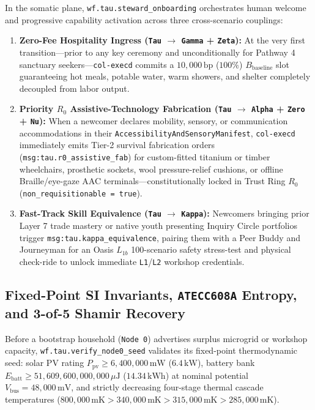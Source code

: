 In the somatic plane, \texttt{wf.tau.steward\_onboarding} orchestrates human welcome and progressive
capability activation across three cross-scenario couplings:
\begin{enumerate}
    \item \textbf{Zero-Fee Hospitality Ingress (\texttt{Tau} $\to$ \texttt{Gamma} + \texttt{Zeta}):}
    At the very first transition---prior to any key ceremony and unconditionally for Pathway 4
    sanctuary seekers---\texttt{col-execd} commits a $10{,}000\,\mathrm{bp}$ ($100\%$)
    $B_{\mathrm{baseline}}$ slot guaranteeing hot meals, potable water, warm showers, and shelter
    completely decoupled from labor output.
    \item \textbf{Priority $R_0$ Assistive-Technology Fabrication (\texttt{Tau} $\to$ \texttt{Alpha}
    + \texttt{Zero} + \texttt{Nu}):} When a newcomer declares mobility, sensory, or communication
    accommodations in their \texttt{AccessibilityAndSensoryManifest}, \texttt{col-execd} immediately
    emits Tier-2 survival fabrication orders (\texttt{msg:tau.r0\_assistive\_fab}) for custom-fitted
    titanium or timber wheelchairs, prosthetic sockets, wool pressure-relief cushions, or offline
    Braille/eye-gaze AAC terminals---constitutionally locked in Trust Ring $R_0$
    (\texttt{non\_requisitionable = true}).
    \item \textbf{Fast-Track Skill Equivalence (\texttt{Tau} $\to$ \texttt{Kappa}):} Newcomers
    bringing prior Layer 7 trade mastery or native youth presenting Inquiry Circle portfolios trigger
    \texttt{msg:tau.kappa\_equivalence}, pairing them with a Peer Buddy and Journeyman for an Oasis
    $L_{1b}$ 100-scenario safety stress-test and physical check-ride to unlock immediate
    \texttt{L1}/\texttt{L2} workshop credentials.
\end{enumerate}

\subsection{Fixed-Point SI Invariants, \texttt{ATECC608A} Entropy, and 3-of-5 Shamir Recovery}

Before a bootstrap household (\texttt{Node 0}) advertises surplus microgrid or workshop capacity,
\texttt{wf.tau.verify\_node0\_seed} validates its fixed-point thermodynamic seed: solar PV rating
$P_{\mathrm{pv}} \ge 6{,}400{,}000\,\mathrm{mW}$ ($6.4\,\mathrm{kW}$), battery bank
$E_{\mathrm{batt}} \ge 51{,}609{,}600{,}000{,}000\,\mu\mathrm{J}$ ($14.34\,\mathrm{kWh}$) at nominal
potential $V_{\mathrm{bus}} = 48{,}000\,\mathrm{mV}$, and strictly decreasing four-stage thermal
cascade temperatures ($800{,}000\,\mathrm{mK} > 340{,}000\,\mathrm{mK} > 315{,}000\,\mathrm{mK} >
285{,}000\,\mathrm{mK}$).

